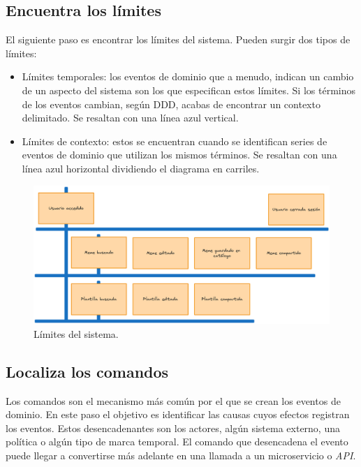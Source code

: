 \subsection{Encuentra los límites}

El siguiente paso es encontrar los límites del sistema. Pueden surgir dos tipos de límites:

\begin{itemize}
    \item Límites temporales: los eventos de dominio que a menudo, indican un cambio de un aspecto del sistema son los que especifican estos límites. Si los términos de los eventos cambian, según DDD, acabas de encontrar un contexto delimitado. Se resaltan con una línea azul vertical.
    \item Límites de contexto: estos se encuentran cuando se identifican series de eventos de dominio que utilizan los mismos términos. Se resaltan con una línea azul horizontal dividiendo el diagrama en carriles.
\end{itemize}

\begin{figure}[ht]
    \caption{Límites del sistema.}
    \centering
    \vspace*{0.5cm}
    \includegraphics[scale=0.15]{figuras/limites.png}
\end{figure}

\subsection{Localiza los comandos}

Los comandos son el mecanismo más común por el que se crean los eventos de dominio. En este paso el objetivo es identificar las causas cuyos efectos registran los eventos. Estos desencadenantes son los actores, algún sistema externo, una política o algún tipo de marca temporal. El comando que desencadena el evento puede llegar a convertirse más adelante en una llamada a un microservicio o \textit{API}.

